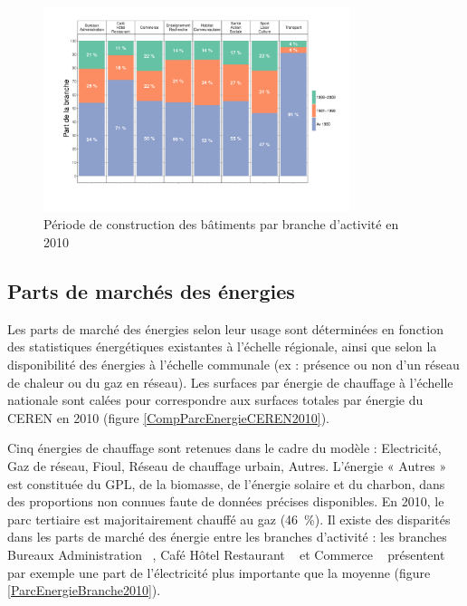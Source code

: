 \documentclass[10.5pt,a4paper]{article}
\begin{document}
{\begin{figure}[ht]
\centering
\caption{Période de construction des bâtiments par branche d'activité en 2010}\label{ParcPeriode2010}
\includegraphics[width = 0.8\textwidth]{ParcPeriodeBranche2010}
\end{figure}

\subsection{Parts de marchés des énergies}

Les parts de marché des énergies selon leur usage sont déterminées en fonction des statistiques énergétiques existantes à l’échelle régionale, ainsi que selon la disponibilité des énergies à l’échelle communale (ex : présence ou non d’un réseau de chaleur ou du gaz en réseau). Les surfaces par énergie de chauffage à l'échelle nationale sont calées pour correspondre aux surfaces totales par énergie du CEREN en 2010 (figure \ref{CompParcEnergieCEREN2010}). 

Cinq énergies de chauffage sont retenues dans le cadre du modèle : Electricité, Gaz de réseau, Fioul, Réseau de chauffage urbain, Autres. L’énergie « Autres » est constituée du GPL, de la biomasse, de l’énergie solaire et du charbon, dans des proportions non connues faute de données précises disponibles. En 2010, le parc tertiaire est majoritairement chauffé au gaz (46~\%). Il existe des disparités dans les parts de marché des énergie entre les branches d'activité : les branches \og Bureaux Administration \fg~, \og Café Hôtel Restaurant \fg~ et \og Commerce \fg~ présentent par exemple une part de l'électricité plus importante que la moyenne (figure \ref{ParcEnergieBranche2010}). 


}
\end{document}
